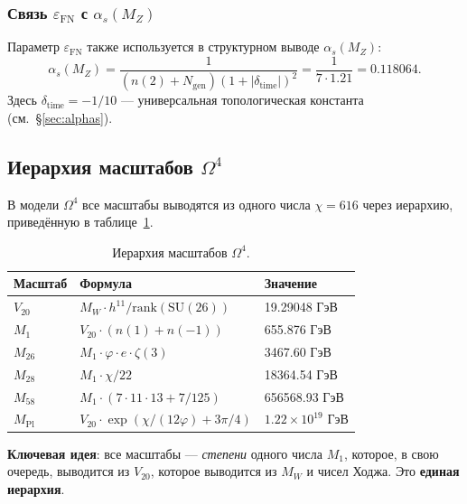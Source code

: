 \documentclass[11pt,a4paper]{article}
\newcommand{\SU}{\ensuremath{\mathrm{SU}}}
\newcommand{\Om}{\ensuremath{\Omega^4}}
\newcommand{\Ngen}{\ensuremath{N_{\text{gen}}}}
\newcommand{\epsFN}{\ensuremath{\varepsilon_{\text{FN}}}}
\theoremstyle{definition}
\begin{document}
\subsubsection{Связь \texorpdfstring{$\epsFN$}{epsilon\_FN} с \texorpdfstring{$\alpha_s(M_Z)$}{alpha\_s(M\_Z)}}

Параметр $\epsFN$ также используется в структурном выводе
$\alpha_s(M_Z)$:
\begin{equation}
    \alpha_s(M_Z) = \frac{1}{(n(2) + \Ngen)(1 + |\delta_{\text{time}}|)^2}
    = \frac{1}{7 \cdot 1.21} = 0.118064.
    \label{eq:alphas-from-eps-fn}
\end{equation}
Здесь $\delta_{\text{time}} = -1/10$ — универсальная
топологическая константа (см.~\S\ref{sec:alphas}).
\subsection{Иерархия масштабов \texorpdfstring{$\Om$}{Omega4}}
\label{subsec:scale-hierarchy}

В модели $\Om$ все масштабы выводятся из одного числа $\chi = 616$
через иерархию, приведённую в таблице~\ref{tab:scale-hierarchy}.

\begin{table}[ht]
\centering
\caption{Иерархия масштабов \texorpdfstring{$\Om$}{}.}
\label{tab:scale-hierarchy}
\begin{tabular}{lll}
\toprule
Масштаб & Формула & Значение \\
\midrule
$V_{20}$ & $M_W \cdot h^{11}/\text{rank}(\SU(26))$ & 19.29048 ГэВ \\
$M_1$ & $V_{20} \cdot (n(1) + n(-1))$ & 655.876 ГэВ \\
$M_{26}$ & $M_1 \cdot \varphi \cdot e \cdot \zeta(3)$ & 3467.60 ГэВ \\
$M_{28}$ & $M_1 \cdot \chi/22$ & 18364.54 ГэВ \\
$M_{58}$ & $M_1 \cdot (7 \cdot 11 \cdot 13 + 7/125)$ & 656568.93 ГэВ \\
$M_{\text{Pl}}$ & $V_{20} \cdot \exp(\chi/(12\varphi) + 3\pi/4)$ & $1.22 \times 10^{19}$ ГэВ \\
\bottomrule
\end{tabular}
\end{table}

\medskip\noindent
\textbf{Ключевая идея}: все масштабы --- \emph{степени} одного
числа $M_1$, которое, в свою очередь, выводится из $V_{20}$,
которое выводится из $M_W$ и чисел Ходжа. Это \textbf{единая иерархия}.
\end{document}
